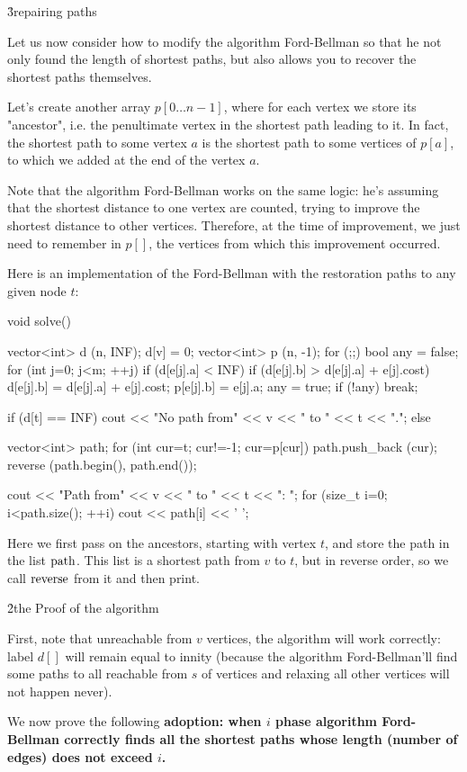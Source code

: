 \h3{repairing paths}

Let us now consider how to modify the algorithm Ford-Bellman so that he not only found the length of shortest paths, but also allows you to recover the shortest paths themselves.

Let's create another array $p[0 \ldots n-1]$, where for each vertex we store its "ancestor", i.e. the penultimate vertex in the shortest path leading to it. In fact, the shortest path to some vertex $a$ is the shortest path to some vertices of $p[a]$, to which we added at the end of the vertex $a$.

Note that the algorithm Ford-Bellman works on the same logic: he's assuming that the shortest distance to one vertex are counted, trying to improve the shortest distance to other vertices. Therefore, at the time of improvement, we just need to remember in $p[]$, the vertices from which this improvement occurred.

Here is an implementation of the Ford-Bellman with the restoration paths to any given node $t$:

\code
void solve() {
vector<int> d (n, INF);
d[v] = 0;
vector<int> p (n, -1);
for (;;) {
bool any = false;
for (int j=0; j<m; ++j)
if (d[e[j].a] < INF)
if (d[e[j].b] > d[e[j].a] + e[j].cost) {
d[e[j].b] = d[e[j].a] + e[j].cost;
p[e[j].b] = e[j].a;
any = true;
}
if (!any) break;
}

if (d[t] == INF)
cout << "No path from" << v << " to " << t << ".";
else {
vector<int> path;
for (int cur=t; cur!=-1; cur=p[cur])
path.push_back (cur);
reverse (path.begin(), path.end());

cout << "Path from" << v << " to " << t << ": ";
for (size_t i=0; i<path.size(); ++i)
cout << path[i] << ' ';
}
}
\endcode

Here we first pass on the ancestors, starting with vertex $t$, and store the path in the list $\rm path$. This list is a shortest path from $v$ to $t$, but in reverse order, so we call $\rm reverse$ from it and then print.


\h2{the Proof of the algorithm}

First, note that unreachable from $v$ vertices, the algorithm will work correctly: label $d[]$ will remain equal to innity (because the algorithm Ford-Bellman'll find some paths to all reachable from $s$ of vertices and relaxing all other vertices will not happen never).

We now prove the following \bf{adoption}: when $i$ phase algorithm Ford-Bellman correctly finds all the shortest paths whose length (number of edges) does not exceed $i$.

